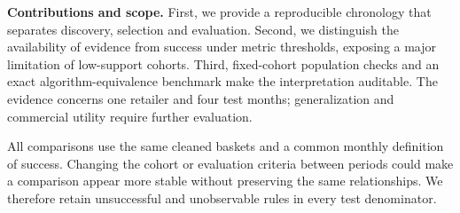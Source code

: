 \textbf{Contributions and scope.} First, we provide a reproducible chronology that separates discovery, selection and evaluation. Second, we distinguish the availability of evidence from success under metric thresholds, exposing a major limitation of low-support cohorts. Third, fixed-cohort population checks and an exact algorithm-equivalence benchmark make the interpretation auditable. The evidence concerns one retailer and four test months; generalization and commercial utility require further evaluation.

All comparisons use the same cleaned baskets and a common monthly definition of success. Changing the cohort or evaluation criteria between periods could make a comparison appear more stable without preserving the same relationships. We therefore retain unsuccessful and unobservable rules in every test denominator.

